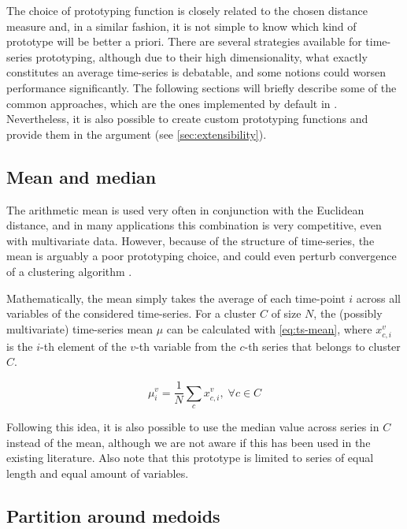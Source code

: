 The choice of prototyping function is closely related to the chosen distance measure and,
in a similar fashion,
it is not simple to know which kind of prototype will be better a priori.
There are several strategies available for time-series prototyping,
although due to their high dimensionality,
what exactly constitutes an average time-series is debatable,
and some notions could worsen performance significantly.
The following sections will briefly describe some of the common approaches,
which are the ones implemented by default in \dtwclust{}.
Nevertheless, it is also possible to create custom prototyping functions and provide them in the  argument
(see \cref{sec:extensibility}).

\subsection{Mean and median}
\label{sec:mean-median}

The arithmetic mean is used very often in conjunction with the Euclidean distance,
and in many applications this combination is very competitive,
even with multivariate data.
However, because of the structure of time-series,
the mean is arguably a poor prototyping choice,
and could even perturb convergence of a clustering algorithm \citep{petitjean2011}.

Mathematically, the mean simply takes the average of each time-point $i$ across all variables of the considered time-series.
For a cluster $C$ of size $N$,
the (possibly multivariate) time-series mean $\mu$ can be calculated with \cref{eq:ts-mean},
where $x^v_{c,i}$ is the $i$-th element of the $v$-th variable from the $c$-th series that belongs to cluster $C$.

\begin{equation}
\label{eq:ts-mean}
\mu^v_i = \frac{1}{N} \sum_c x^v_{c,i}, \; \forall c \in C
\end{equation}

Following this idea, it is also possible to use the median value across series in $C$ instead of the mean,
although we are not aware if this has been used in the existing literature.
Also note that this prototype is limited to series of equal length and equal amount of variables.

\subsection{Partition around medoids}
\label{sec:pam}

